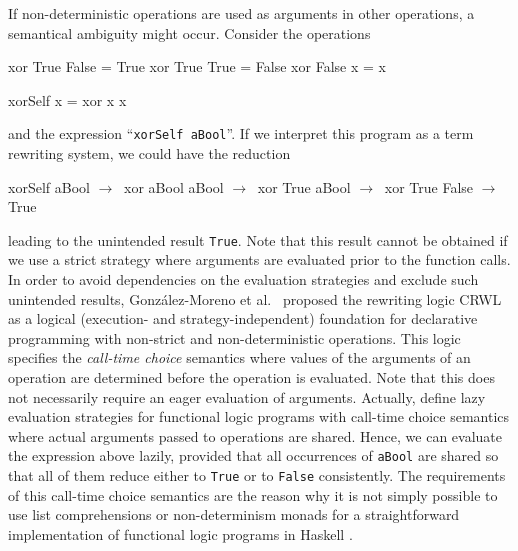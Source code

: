 \documentclass{llncs}
\newcommand{\code}[1]{\mbox{\small\texttt{#1}}}
\newcommand{\ccode}[1]{``\code{#1}''}
\begin{document}
If non-deterministic operations are used as arguments in other operations,
a semantical ambiguity might occur. Consider the operations
%
\begin{curry}
  xor True  False = True
  xor True  True  = False
  xor False x     = x

  xorSelf x = xor x x
\end{curry}
%
and the expression \ccode{xorSelf aBool}.
If we interpret this program as a term rewriting system,
we could have the reduction
\begin{haskell}
  xorSelf aBool  $\to~$  xor aBool aBool     $\to~$  xor True aBool
                 $\to~$  xor True False      $\to~$  True
\end{haskell}
leading to the unintended result \code{True}.
Note that this result cannot be obtained if we use a strict strategy
where arguments are evaluated prior to the function calls.
In order to avoid dependencies on the evaluation strategies
and exclude such unintended results,
Gonz\'alez-Moreno et al.\ \cite{GonzalezEtAl99} proposed
the rewriting logic CRWL as a logical
(execution- and strategy-independent) foundation for declarative
programming with non-strict and non-deterministic operations.  This
logic specifies the \emph{call-time choice} semantics \cite{Hussmann92}
\label{ctc-semantics}
where values of the arguments of an operation are determined before the
operation is evaluated. Note that this does not necessarily require
an eager evaluation of arguments.
Actually, \cite{AlbertHanusHuchOliverVidal05,LopezRodriguezSanchez07}
define lazy evaluation strategies for functional logic programs
with call-time choice semantics where actual arguments passed to
operations are shared. Hence, we can evaluate the expression above
lazily, provided that all occurrences of \code{aBool}
are shared so that all of them reduce either to \code{True} or to \code{False}
consistently. The requirements of this call-time choice semantics are the
reason why it is not simply possible to use list comprehensions
or non-determinism monads for a straightforward implementation
of functional logic programs in Haskell \cite{FischerKiselyovShan09}.
\end{document}
